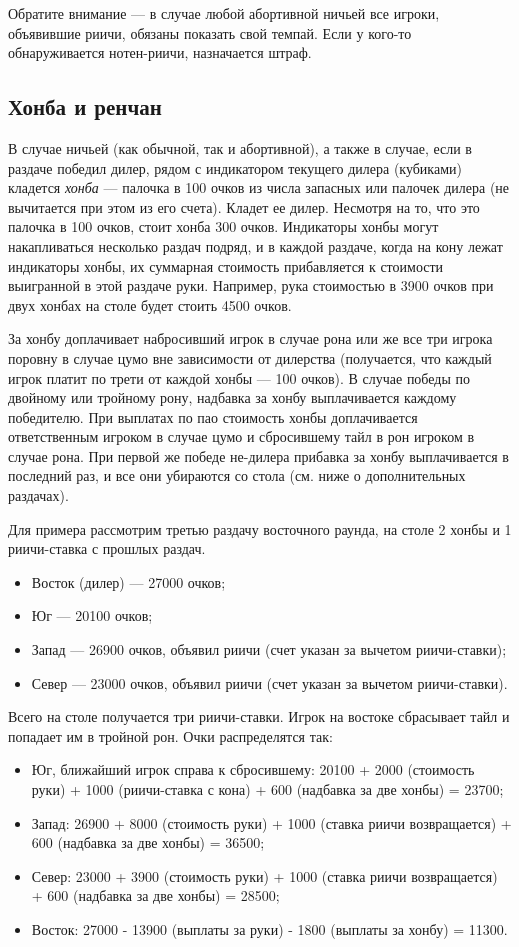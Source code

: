 Обратите внимание --- в случае любой абортивной ничьей все игроки, объявившие риичи, обязаны показать свой темпай. Если у кого-то обнаруживается нотен-риичи, назначается штраф.

\subsection{Хонба и ренчан}

В случае ничьей (как обычной, так и абортивной), а также в случае, если в раздаче победил дилер, рядом с индикатором текущего дилера (кубиками) кладется \textit{хонба} --- палочка в 100 очков из числа запасных или палочек дилера (не вычитается при этом из его счета). Кладет ее дилер. Несмотря на то, что это палочка в 100 очков, стоит хонба 300 очков. Индикаторы хонбы могут накапливаться несколько раздач подряд, и в каждой раздаче, когда на кону лежат индикаторы хонбы, их суммарная стоимость прибавляется к стоимости выигранной в этой раздаче руки. Например, рука стоимостью в 3900 очков при двух хонбах на столе будет стоить 4500 очков. 

За хонбу доплачивает набросивший игрок в случае рона или же все три игрока поровну в случае цумо вне зависимости от дилерства (получается, что каждый игрок платит по трети от каждой хонбы --- 100 очков). В случае победы по двойному или тройному рону, надбавка за хонбу выплачивается каждому победителю. При выплатах по пао стоимость хонбы доплачивается ответственным игроком в случае цумо и сбросившему тайл в рон игроком в случае рона. При первой же победе не-дилера прибавка за хонбу выплачивается в последний раз, и все они убираются со стола (см. ниже о дополнительных раздачах).

Для примера рассмотрим третью раздачу восточного раунда, на столе 2 хонбы и 1 риичи-ставка с прошлых раздач.
\begin{itemize}
	\item Восток (дилер) --- 27000 очков;
	\item Юг --- 20100 очков;
	\item Запад --- 26900 очков, объявил риичи (счет указан за вычетом риичи-ставки);
	\item Север --- 23000 очков, объявил риичи (счет указан за вычетом риичи-ставки).
\end{itemize}

Всего на столе получается три риичи-ставки. Игрок на востоке сбрасывает тайл и попадает им в тройной рон. Очки распределятся так:
\begin{itemize}
	\item Юг, ближайший игрок справа к сбросившему: 20100 + 2000 (стоимость руки) + 1000 (риичи-ставка с кона) + 600 (надбавка за две хонбы) = 23700;
	\item Запад: 26900 + 8000 (стоимость руки) + 1000 (ставка риичи возвращается) + 600 (надбавка за две хонбы) = 36500;
	\item Север: 23000 + 3900 (стоимость руки) + 1000 (ставка риичи возвращается) + 600 (надбавка за две хонбы) = 28500;
	\item Восток: 27000 - 13900 (выплаты за руки) - 1800 (выплаты за хонбу) = 11300.
\end{itemize}

